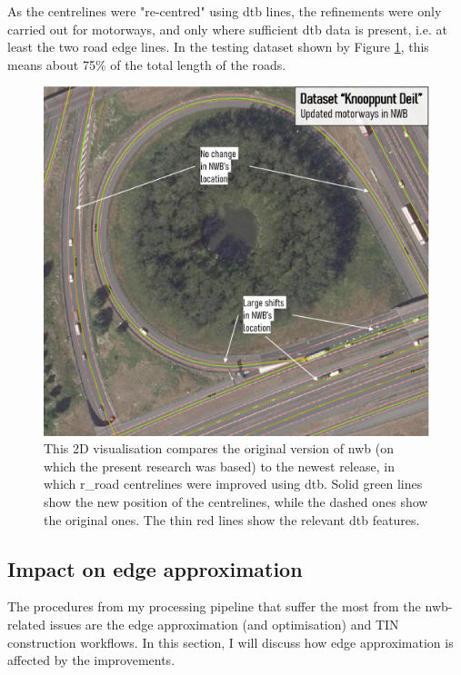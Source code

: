 As the centrelines were "re-centred" using \ac{dtb} lines, the refinements were only carried out for motorways, and only where sufficient \ac{dtb} data is present, i.e. at least the two road edge lines. In the testing dataset shown by Figure \ref{fig:nwb_updated_geometry}, this means about 75\% of the total length of the roads.

\begin{figure}[h]
    \centering
    \includegraphics[width=0.84\linewidth]{final_report/figs/nwb_updated_geometry.png}
    \caption[Figure illustrating recent NWB improvements]{This 2D visualisation compares the original version of \ac{nwb} (on which the present research was based) to the newest release, in which \ac{r_road} centrelines were improved using \ac{dtb}. Solid green lines show the new position of the centrelines, while the dashed ones show the original ones. The thin red lines show the relevant \ac{dtb} features.}
    \label{fig:nwb_updated_geometry}
\end{figure}

\subsection{Impact on edge approximation}
\label{sub:nwb_updated_edgeapproximation}

The procedures from my processing pipeline that suffer the most from the \ac{nwb}-related issues are the edge approximation (and optimisation) and TIN construction workflows. In this section, I will discuss how edge approximation is affected by the improvements.

